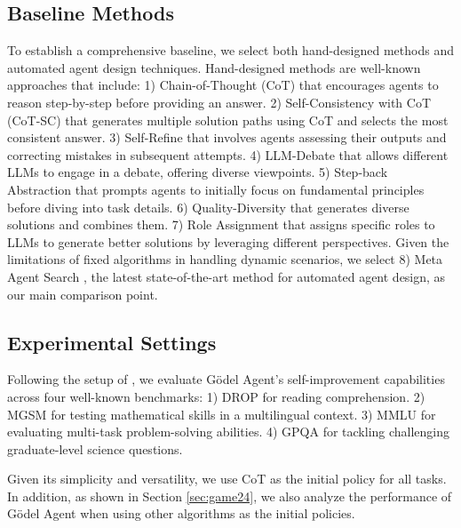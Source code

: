 \documentclass[11pt]{article}
\newcommand{\framework}{Gödel Agent\xspace}
\begin{document}
\subsection{Baseline Methods}
To establish a comprehensive baseline, we select both hand-designed methods and automated agent design techniques. Hand-designed methods are well-known approaches that include:
1) Chain-of-Thought (CoT) \citep{wei2022chain} that encourages agents to reason step-by-step before providing an answer.
2) Self-Consistency with CoT (CoT-SC) \citep{wang2023selfconsistencyimproveschainthought} that generates multiple solution paths using CoT and selects the most consistent answer.
3) Self-Refine \citep{madaan2024self} that involves agents assessing their outputs and correcting mistakes in subsequent attempts.
4) LLM-Debate \citep{du2023improvingfactualityreasoninglanguage} that allows different LLMs to engage in a debate, offering diverse viewpoints.
5) Step-back Abstraction \citep{zheng2024stepbackevokingreasoning} that prompts agents to initially focus on fundamental principles before diving into task details.
6) Quality-Diversity \citep{lu2024aiscientistfullyautomated} that generates diverse solutions and combines them.
7) Role Assignment \citep{xu2023expertpromptinginstructinglargelanguage} that assigns specific roles to LLMs to generate better solutions by leveraging different perspectives.
Given the limitations of fixed algorithms in handling dynamic scenarios, we select 8) Meta Agent Search \citep{hu2024automated}, the latest state-of-the-art method for automated agent design, as our main comparison point. 


\subsection{Experimental Settings}
Following the setup of \citet{hu2024automated}, we evaluate \framework's self-improvement capabilities across four well-known benchmarks:
1) DROP \citep{dua2019dropreadingcomprehensionbenchmark} for reading comprehension.
2) MGSM \citep{shi2022languagemodelsmultilingualchainofthought} for testing mathematical skills in a multilingual context.
3) MMLU \citep{hendrycks2021measuringmassivemultitasklanguage} for evaluating multi-task problem-solving abilities.
4) GPQA \citep{rein2023gpqagraduatelevelgoogleproofqa} for tackling challenging graduate-level science questions.



Given its simplicity and versatility, we use CoT as the initial policy for all tasks.
In addition, as shown in Section \ref{sec:game24}, we also analyze the performance of \framework when using other algorithms as the initial policies.
\end{document}
